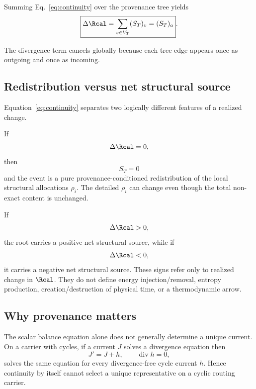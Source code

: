 \begin{corollary}
\label{cor:global-balance}
Summing Eq.~\eqref{eq:continuity} over the provenance tree yields
\begin{equation}
\boxed{
\Delta\Rcal=\sum_{v\in V_T}(S_T)_v=(S_T)_a
}.
\label{eq:global-balance}
\end{equation}
\end{corollary}

The divergence term cancels globally because each tree edge appears once as outgoing and once as incoming.

\subsection{Redistribution versus net structural source}

Equation~\eqref{eq:continuity} separates two logically different features of a realized change.

If
\begin{equation}
\Delta\Rcal=0,
\end{equation}
then
\begin{equation}
S_T=0
\end{equation}
and the event is a pure provenance-conditioned redistribution of the local structural allocations $\rho_i$. The detailed $\rho_i$ can change even though the total non-exact content is unchanged.

If
\begin{equation}
\Delta\Rcal>0,
\end{equation}
the root carries a positive net structural source, while if
\begin{equation}
\Delta\Rcal<0,
\end{equation}
it carries a negative net structural source. These signs refer only to realized change in $\Rcal$. They do not define energy injection/removal, entropy production, creation/destruction of physical time, or a thermodynamic arrow.

\subsection{Why provenance matters}

The scalar balance equation alone does not generally determine a unique current. On a carrier with cycles, if a current $J$ solves a divergence equation then
\begin{equation}
J' = J+h,
\qquad
\operatorname{div}h=0,
\label{eq:div-free-ambiguity}
\end{equation}
solves the same equation for every divergence-free cycle current $h$. Hence continuity by itself cannot select a unique representative on a cyclic routing carrier.

